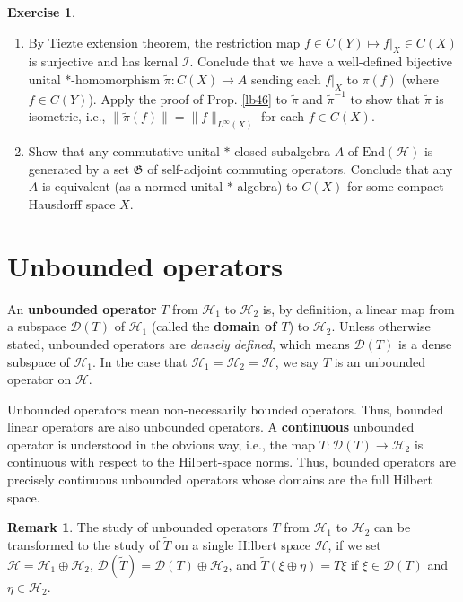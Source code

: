 \documentclass[12pt,a4paper,notitlepage]{article}
\theoremstyle{definition}
\newtheorem{exe}[df]{Exercise}
\newtheorem{rem}[df]{Remark}
\theoremstyle{plain}
\newcommand{\fk}{\mathfrak}
\newcommand{\mc}{\mathcal}
\newcommand{\wtd}{\widetilde}
\newcommand{\End}{\mathrm{End}} %
\newcommand{\Dom}{\scr D}
\newcommand{\scr}{\mathscr}
\numberwithin{equation}{section}
\begin{document}
\begin{exe}
\begin{enumerate}
\item By Tiezte extension theorem, the restriction map $f\in C(Y)\mapsto f|_X\in C(X)$ is surjective and has kernal $\mc I$. Conclude that we have a well-defined bijective unital $*$-homomorphism $\wtd\pi:C(X)\rightarrow A$ sending each $f|_X$ to $\pi(f)$ (where $f\in C(Y)$). Apply the proof of Prop. \ref{lb46} to $\wtd\pi$ and $\wtd\pi^{-1}$ to show that $\wtd\pi$ is isometric, i.e., $\lVert  \wtd\pi(f)\lVert=\lVert f\lVert_{L^\infty(X)}$ for each $f\in C(X)$.

\item Show that any commutative unital $*$-closed subalgebra $A$ of $\End(\mc H)$ is generated by a set $\fk G$ of self-adjoint commuting operators. Conclude that any $A$ is equivalent (as a normed unital $*$-algebra) to $C(X)$ for some compact Hausdorff space $X$.
\end{enumerate}
\end{exe}














\section{Unbounded operators}




An \textbf{unbounded operator} $T$ from $\mc H_1$ to $\mc H_2$ is, by definition, a linear map from a subspace $\scr D(T)$ of $\mc H_1$ (called the \textbf{domain of $T$}) to $\mc H_2$. Unless otherwise stated, unbounded operators are \textit{densely defined}, which means $\Dom(T)$ is a dense subspace of $\mc H_1$. In the case that $\mc H_1=\mc H_2=\mc H$, we say $T$ is an unbounded operator on $\mc H$. 

Unbounded operators mean non-necessarily bounded operators. Thus, bounded linear operators are also unbounded operators. A \textbf{continuous} unbounded operator is understood in the obvious way, i.e., the map $T:\scr D(T)\rightarrow\mc H_2$ is continuous with respect to the Hilbert-space norms. Thus, bounded operators are precisely continuous unbounded operators whose domains are the full Hilbert space.

\begin{rem}
The study of unbounded operators $T$ from $\mc H_1$ to $\mc H_2$ can be transformed to the study of $\wtd T$ on a single Hilbert space $\mc H$, if we set $\mc H=\mc H_1\oplus\mc H_2$, $\scr D(\wtd T)=\scr D(T)\oplus\mc H_2$, and $\wtd T(\xi\oplus\eta)=T\xi$ if $\xi\in\scr D(T)$ and $\eta\in\mc H_2$.
\end{rem}
\end{document}
